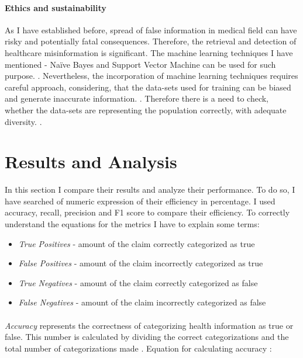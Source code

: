 \documentclass[11pt ,english,a4paper]{article}
\begin{document}
\paragraph{Ethics and sustainability}%
As I have established before, spread of false information in medical field can have risky and potentially fatal consequences. Therefore, the retrieval and detection of healthcare misinformation is significant. The machine learning techniques I have mentioned - Naïve Bayes and Support Vector Machine can be used for such purpose. \cite{chap22unmask}. Nevertheless, the incorporation of machine learning techniques requires careful approach, considering, that the data-sets used for training can be biased and generate inaccurate information. \cite{who21ethics}. Therefore there is a need to check, whether the data-sets are representing the population correctly, with adequate diversity. \cite{sch23aut}.

\section{Results and Analysis}\label{analysis}
In this section I compare their results and analyze their performance. To do so, I have searched of numeric expression of their efficiency in percentage. I used accuracy, recall, precision and F1 score to compare their efficiency. To correctly understand the equations for the metrics I have to explain some terms:

\begin{itemize}
\item \emph{True Positives} - amount of the claim correctly categorized as true
\item \emph{False Positives} - amount of the claim incorrectly categorized as true
\item \emph{True Negatives} - amount of the claim correctly categorized as false
\item \emph{False Negatives} - amount of the claim incorrectly categorized as false
\end{itemize}

\paragraph{} \emph{Accuracy} represents the correctness of categorizing health information as true or false. This number is calculated by dividing the correct categorizations and the total number of categorizations made \cite{aph18detect}. Equation for calculating accuracy \cite{sha20mach}:
\end{document}
